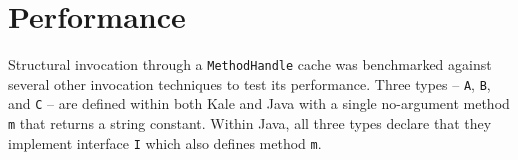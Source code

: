 \begin{comment}
\subsection{Pointers}

Function and field pointers have always been technically possible on the JVM, simulated using the Field and Method reflection classes.  However, the overhead was always higher than necessary.  Fields and Methods had a high simulation cost to begin with, and to generalize their interface (as invokedynamic does with a MethodHandle) would require another layer of indirection, like a Pointer class with a call(Object[]) method that was implemented by a FunctionPointer and FieldPointer class.  This would require several object allocations (the reflection instance, the reflection wrapper instance, and the boxing overhead from the argument conversion into an Object array).  This overhead made pointers less practical to implement on the JVM.

Invokedynamic changes all that by providing low-cost pointers by generalizing function pointers and field pointers into the MethodHandle.

\end{comment}

\section{Performance}

Structural invocation through a \texttt{MethodHandle} cache was benchmarked against several other invocation techniques to test its performance.  Three types -- \texttt{A}, \texttt{B}, and \texttt{C} -- are defined within both Kale and Java with a single no-argument method \texttt{m} that returns a string constant.  Within Java, all three types declare that they implement interface \texttt{I} which also defines method \texttt{m}.

